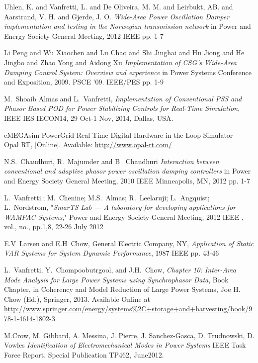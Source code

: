 \documentclass[journal]{IEEEtran}
\begin{document}
\begin{thebibliography}{1}
 Uhlen, K. and Vanfretti, L. and De Oliveira, M. M. and Leirbukt, AB. and Aarstrand, V. H. and Gjerde, J. O. \emph{Wide-Area Power Oscillation Damper implementation and testing in the Norwegian transmission network} in Power and Energy Society General Meeting, 2012 IEEE pp. 1-7

 Li Peng and Wu Xiaochen and Lu Chao and Shi Jinghai and Hu Jiong and He Jingbo and Zhao Yong and Aidong Xu \emph{Implementation of CSG's Wide-Area Damping Control System: Overview and experience} in Power Systems Conference and Exposition, 2009. PSCE '09. IEEE/PES pp. 1-9
  
 M.~Shoaib Almas and L.~Vanfretti, \emph{Implementation of Conventional PSS and Phasor Based POD for Power Stabilizing Controls for Real-Time Simulation}, IEEE IES IECON14, 29 Oct-1 Nov, 2014, Dallas, USA.

 eMEGAsim PowerGrid Real-Time Digital Hardware in the Loop Simulator — Opal RT, [Online]. Available: \url{http://www.opal-rt.com/}

 N.S.~Chaudhuri, R.~Majumder and B~ Chaudhuri \emph{Interaction between conventional and adaptive phasor power oscillation damping controllers} in Power and Energy Society General Meeting, 2010 IEEE Minneapolis, MN, 2012 pp. 1-7

 L.~Vanfretti.; M.~Chenine; M.S.~Almas; R.~Leelaruji; L.~Angquist; L.~Nordstrom, "\emph{SmarTS Lab — A laboratory for developing applications for WAMPAC Systems}," Power and Energy Society General Meeting, 2012 IEEE , vol., no., pp.1,8, 22-26 July 2012

 E.V~Larsen and E.H~Chow, General Electric Company, NY, \emph{Application of Static VAR Systems for System Dynamic Performance}, 1987 IEEE pp. 43-46

  L.~Vanfretti, Y.~Chompoobutrgool, and J.H.~Chow, \emph{Chapter 10: Inter-Area Mode Analysis for Large Power Systems using Synchrophasor Data}, Book Chapter, in Coherency and Model Reduction of Large Power Systems, Joe H. Chow (Ed.), Springer, 2013. Available Online at \url{http://www.springer.com/energy/systems\%2C+storage+and+harvesting/book/978-1-4614-1802-3}

 M.Crow, M. Gibbard, A. Messina, J. Pierre, J. Sanchez-Gasca, D. Trudnowski, D. Vowles \emph{Identification of Electromechanical Modes in Power Systems} IEEE Task Force Report, Special Publication TP462, June2012.


\end{thebibliography}
\end{document}
